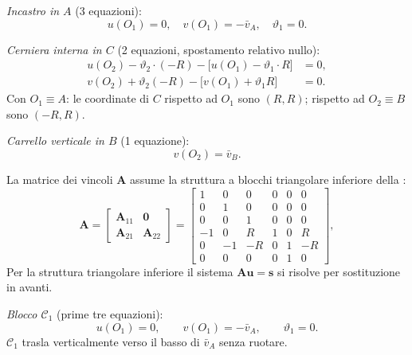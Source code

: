 \begin{esempio}
\begin{svolgimento}
		\noindent\textit{Incastro in $A$} (3 equazioni):
		\begin{equation*}
			u(O_1) = 0, \quad
			v(O_1) = -\bar{v}_A, \quad
			\vartheta_1 = 0.
		\end{equation*}
		
		\noindent\textit{Cerniera interna in $C$}
		(2 equazioni, spostamento relativo nullo):
		\begin{align*}
			u(O_2) - \vartheta_2\cdot(-R) -
			\bigl[u(O_1) - \vartheta_1\cdot R\bigr] &= 0, \\
			v(O_2) + \vartheta_2 (-R) -
			\bigl[v(O_1) + \vartheta_1R\bigr] &= 0.
		\end{align*}
		Con $O_1\equiv A$: le coordinate di $C$ rispetto ad
		$O_1$ sono $(R, R)$; rispetto ad $O_2\equiv B$ sono
		$(-R, R)$.
		
		\noindent\textit{Carrello verticale in $B$}
		(1 equazione):
		\[
		v(O_2) = \bar{v}_B.
		\]
		
		La matrice dei vincoli $\bm{A}$ assume la struttura
		a blocchi triangolare inferiore della
		:
		\begin{equation*}
			\bm{A} =
			\begin{bmatrix}
				\bm{A}_{11} & \bm{0} \\[4pt]
				\bm{A}_{21} & \bm{A}_{22}
			\end{bmatrix}
			=
			\left[
			\begin{array}{ccc|ccc}
				1 & 0 &  0 & 0 & 0 &  0 \\
				0 & 1 &  0 & 0 & 0 &  0 \\
				0 & 0 &  1 & 0 & 0 &  0 \\
				\hline
				-1 & 0 &  R & 1 & 0 &  R \\
				0 &-1 & -R & 0 & 1 & -R \\
				0 & 0 &  0 & 0 & 1 &  0
			\end{array}
			\right],
		\end{equation*}
		Per la struttura triangolare inferiore il sistema
		$\bm{A}\bm{u}=\bm{s}$ si risolve per sostituzione
		in avanti.
		
		\noindent\textit{Blocco $\mathcal{C}_1$}
		(prime tre equazioni):
		\[
		u(O_1) = 0, \qquad
		v(O_1) = -\bar{v}_A, \qquad
		\vartheta_1 = 0.
		\]
		$\mathcal{C}_1$ trasla verticalmente verso il basso
		di $\bar{v}_A$ senza ruotare.
		

\end{svolgimento}
\end{esempio}
